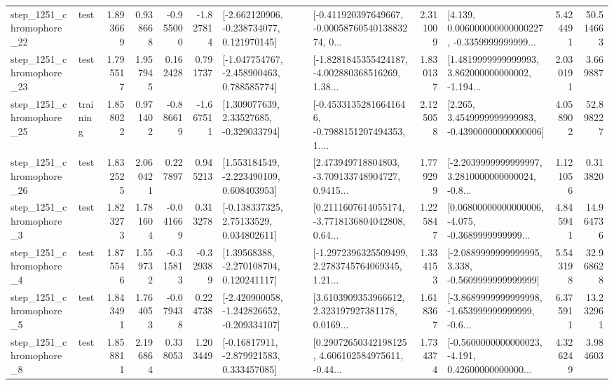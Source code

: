 \begin{tabular}{llrrrrllrlrr}
 step\_1251\_chromophore\_22 &      test &      1.893669 &    0.938668 &     -0.955000 & -1.827814 &   [-2.662120906, -0.238734077, 0.121970145] &  [-0.411920397649667, -0.0005876054013883274, 0... &       2.311009 &  [4.139, 0.006000000000000227, -0.3359999999999... &            5.424491 &         50.514663 \\
 step\_1251\_chromophore\_23 &      test &      1.795517 &    1.957945 &      0.162428 &  0.791737 &   [-1.047754767, -2.458900463, 0.788585774] &  [-1.8281845355424187, -4.002880368516269, 1.38... &       1.830137 &  [1.4819999999999993, 3.862000000000002, -1.194... &            2.030191 &          3.669887 \\
 step\_1251\_chromophore\_25 &  training &      1.858022 &    0.971402 &     -0.886619 & -1.667511 &     [1.309077639, 2.33527685, -0.329033794] &  [-0.45331352816641646, -0.7988151207494353, 1.... &       2.125058 &  [2.265, 3.4549999999999983, -0.43900000000000006] &            4.058902 &         52.898227 \\
 step\_1251\_chromophore\_26 &      test &      1.832525 &    2.060421 &      0.227897 &  0.945213 &    [1.553184549, -2.223490109, 0.608403953] &  [2.473949718804803, -3.709133748904727, 0.9415... &       1.779299 &  [-2.2039999999999997, 3.2810000000000024, -0.8... &            1.121056 &          0.313820 \\
  step\_1251\_chromophore\_3 &      test &      1.823273 &    1.781604 &     -0.041669 &  0.313278 &     [-0.138337325, 2.75133529, 0.034802611] &  [0.2111607614055174, -3.7718136804042808, 0.64... &       1.225847 &  [0.06800000000000006, -4.075, -0.3689999999999... &            4.845941 &         14.964736 \\
  step\_1251\_chromophore\_4 &      test &      1.875546 &    1.559732 &     -0.315813 & -0.329389 &     [1.39568388, -2.270108704, 0.120241117] &  [-1.2972396325509499, 2.2783745764069345, 1.21... &       1.334153 &  [-2.0889999999999995, 3.338, -0.5609999999999999] &            5.543198 &         32.968628 \\
  step\_1251\_chromophore\_5 &      test &      1.843491 &    1.764053 &     -0.079438 &  0.224738 &  [-2.420900058, -1.242826652, -0.209334107] &  [3.6103909353966612, 2.323197927381178, 0.0169... &       1.618367 &  [-3.8689999999999998, -1.653999999999999, -0.6... &            6.375911 &         13.232961 \\
  step\_1251\_chromophore\_8 &      test &      1.858811 &    2.196864 &      0.338053 &  1.203449 &    [-0.16817911, -2.879921583, 0.333457085] &  [0.29072650342198125, 4.606102584975611, -0.44... &       1.734374 &  [-0.5600000000000023, -4.191, 0.42600000000000... &            4.326249 &          3.984603 \\

\end{tabular}
